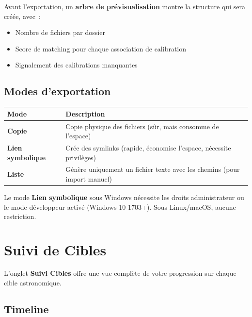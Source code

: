 \documentclass[a4paper,11pt]{article}
\begin{document}
Avant l'exportation, un \textbf{arbre de pr\'{e}visualisation} montre la structure qui sera cr\'{e}\'{e}e, avec~:

\begin{itemize}
    \item Nombre de fichiers par dossier
    \item Score de matching pour chaque association de calibration
    \item Signalement des calibrations manquantes
\end{itemize}

\subsection{Modes d'exportation}

\begin{center}
\begin{tabularx}{\textwidth}{l X}
\toprule
\textbf{Mode} & \textbf{Description} \\
\midrule
\textbf{Copie} & Copie physique des fichiers (s\^{u}r, mais consomme de l'espace) \\
\textbf{Lien symbolique} & Cr\'{e}e des symlinks (rapide, \'{e}conomise l'espace, n\'{e}cessite privil\`{e}ges) \\
\textbf{Liste} & G\'{e}n\`{e}re uniquement un fichier texte avec les chemins (pour import manuel) \\
\bottomrule
\end{tabularx}
\end{center}

\begin{warningbox}
Le mode \textbf{Lien symbolique} sous Windows n\'{e}cessite les droits administrateur ou le mode d\'{e}veloppeur activ\'{e} (Windows 10 1703+). Sous Linux/macOS, aucune restriction.
\end{warningbox}


\section{Suivi de Cibles}
\label{sec:cibles}

L'onglet \textbf{Suivi Cibles} offre une vue compl\`{e}te de votre progression sur chaque cible astronomique.

\subsection{Timeline}
\end{document}
